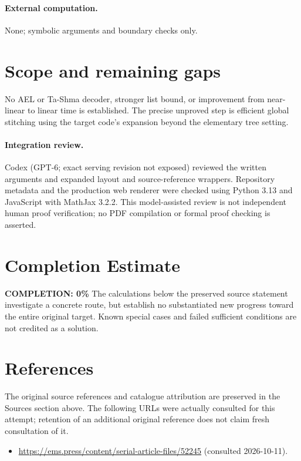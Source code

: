 \documentclass[11pt]{article}
\begin{document}
\paragraph{External computation.} None; symbolic arguments and boundary checks only.
\section{Scope and remaining gaps}
No AEL or Ta-Shma decoder, stronger list bound, or improvement from near-linear to linear time is established. The precise unproved step is efficient global stitching using the target code's expansion beyond the elementary tree setting.
\paragraph{Integration review.} Codex (GPT-6; exact serving revision not exposed) reviewed the written arguments and expanded layout and source-reference wrappers. Repository metadata and the production web renderer were checked using Python 3.13 and JavaScript with MathJax 3.2.2. This model-assisted review is not independent human proof verification; no PDF compilation or formal proof checking is asserted.

\section{Completion Estimate}
\noindent\textbf{COMPLETION: 0\%}
The calculations below the preserved source statement investigate a concrete route,
but establish no substantiated new progress toward the entire original target.
Known special cases and failed sufficient conditions are not credited as a solution.
\section{References}
The original source references and catalogue attribution are preserved in the
Sources section above. The following URLs were actually consulted for this attempt;
retention of an additional original reference does not claim fresh consultation of it.
\begin{itemize}
\item \url{https://ems.press/content/serial-article-files/52245} (consulted 2026-10-11). 
\end{itemize}
\end{document}
